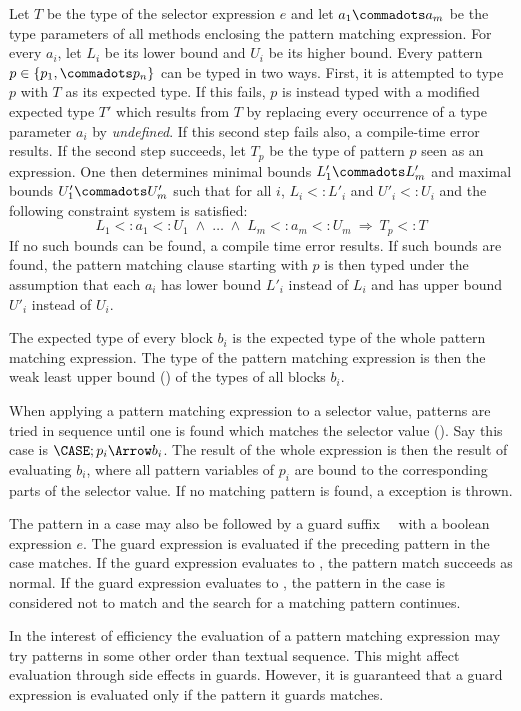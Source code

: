 Let $T$ be the type of the selector expression $e$ and let $a_1
\commadots a_m$ be the type parameters of all methods enclosing 
the pattern matching expression.  For every $a_i$, let $L_i$ be its
lower bound and $U_i$ be its higher bound.  Every pattern $p \in
\{p_1, \commadots p_n\}$ can be typed in two ways. First, it is attempted
to type $p$ with $T$ as its expected type. If this fails, $p$ is
instead typed with a modified expected type $T'$ which results from
$T$ by replacing every occurrence of a type parameter $a_i$ by
\mbox{\sl undefined}.  If this second step fails also, a compile-time
error results. If the second step succeeds, let $T_p$ be the type of
pattern $p$ seen as an expression. One then determines minimal bounds
$L'_1 \commadots L'_m$ and maximal bounds $U'_1 \commadots U'_m$ such
that for all $i$, $L_i <: L'_i$ and $U'_i <: U_i$ and the following
constraint system is satisfied:
\[
    L_1 <: a_1 <: U_1\;\wedge\;\ldots\;\wedge\;L_m <: a_m <: U_m
    \ \Rightarrow\ T_p <: T
\]
If no such bounds can be found, a compile time error results.  If such
bounds are found, the pattern matching clause starting with $p$ is
then typed under the assumption that each $a_i$ has lower bound $L'_i$
instead of $L_i$ and has upper bound $U'_i$ instead of $U_i$.

The expected type of every block $b_i$ is the expected type of the
whole pattern matching expression.  The type of the pattern matching
expression is then the weak least upper bound
()
of the types of all blocks
$b_i$.

When applying a pattern matching expression to a selector value,
patterns are tried in sequence until one is found which matches the
selector value (). Say this case is $\CASE;p_i
\Arrow b_i$.  The result of the whole expression is then the result of
evaluating $b_i$, where all pattern variables of $p_i$ are bound to
the corresponding parts of the selector value.  If no matching pattern
is found, a  exception is thrown.

The pattern in a case may also be followed by a guard suffix \
\ with a boolean expression $e$.  The guard expression is
evaluated if the preceding pattern in the case matches. If the guard
expression evaluates to \code{true}, the pattern match succeeds as
normal. If the guard expression evaluates to \code{false}, the pattern
in the case is considered not to match and the search for a matching
pattern continues.

In the interest of efficiency the evaluation of a pattern matching
expression may try patterns in some other order than textual
sequence. This might affect evaluation through
side effects in guards. However, it is guaranteed that a guard
expression is evaluated only if the pattern it guards matches.

